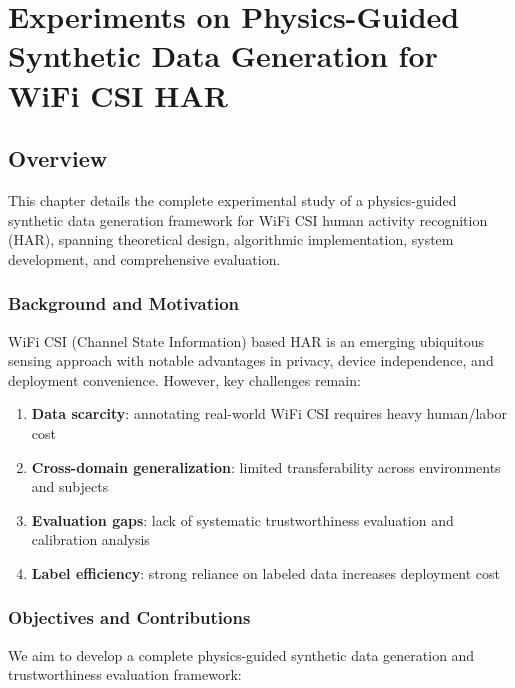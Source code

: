 
\chapter{Experiments on Physics-Guided Synthetic Data Generation for WiFi CSI HAR}
\label{chap:experiments}

\section{Overview}
\label{sec:overview}

This chapter details the complete experimental study of a physics-guided synthetic data generation framework for WiFi CSI human activity recognition (HAR), spanning theoretical design, algorithmic implementation, system development, and comprehensive evaluation.

\subsection{Background and Motivation}
\label{subsec:motivation}

WiFi CSI (Channel State Information) based HAR is an emerging ubiquitous sensing approach with notable advantages in privacy, device independence, and deployment convenience. However, key challenges remain:

\begin{enumerate}
\item \textbf{Data scarcity}: annotating real-world WiFi CSI requires heavy human/labor cost
\item \textbf{Cross-domain generalization}: limited transferability across environments and subjects  
\item \textbf{Evaluation gaps}: lack of systematic trustworthiness evaluation and calibration analysis
\item \textbf{Label efficiency}: strong reliance on labeled data increases deployment cost
\end{enumerate}

\subsection{Objectives and Contributions}
\label{subsec:objectives}

We aim to develop a complete physics-guided synthetic data generation and trustworthiness evaluation framework:


